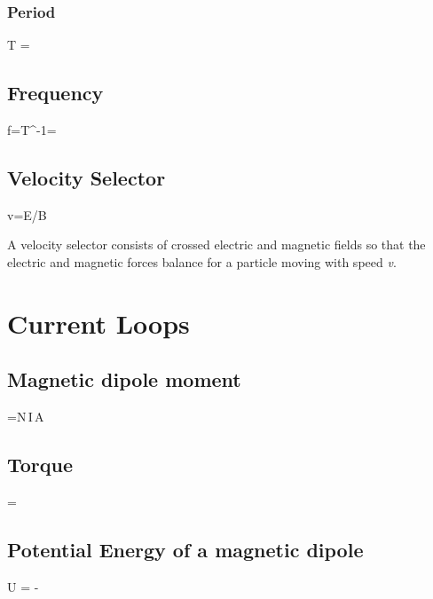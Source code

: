 \documentclass[\mainfilename]{subfiles}
\begin{document}
\begin{sectionBox}
\begin{multicols}{2}
        \subsubsection{Period}
        \begin{BM}
            T = 
        \end{BM}
        
        \subsection{Frequency}
        \begin{BM}
            f=T^{-1}=
        \end{BM}
    \end{multicols}

    \subsection{Velocity Selector}
    \begin{BM}
        v=E/B
    \end{BM}
    A velocity selector consists of crossed electric and magnetic fields so that the electric and magnetic forces balance for a particle moving with speed \textit{v}.

    \section*{Current Loops}

    \subsection{Magnetic dipole moment}
    \begin{BM}
        \vv{\mu}=N\,I\,A\,
    \end{BM}

    \subsection{Torque}
    \begin{BM}
        \vv{\tau}=\vv{\mu}\times{}
    \end{BM}

    \subsection{Potential Energy of a magnetic dipole}
    \begin{BM}
        U = -\vv{\mu}\cdot{}
    \end{BM}


\end{sectionBox}
\end{document}

